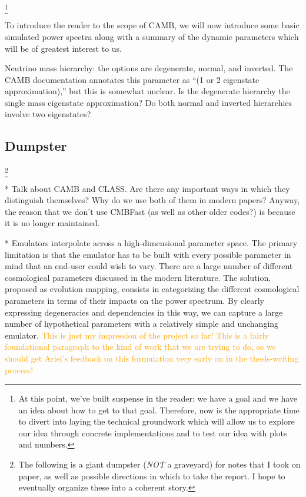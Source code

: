 \documentclass[11pt]{article}
\begin{document}
\footnote{
    At this point, we've built suspense in the reader: we have a goal and
    we have an idea about how to get to that goal. Therefore, now is the
    appropriate time to divert into laying the technical groundwork which
    will allow us to explore our idea through concrete implementations and
    to test our idea with plots and numbers.
}

To introduce the reader to the scope of CAMB, we will now introduce
some basic simulated power spectra along with a summary of the dynamic
parameters which will be of greatest interest to us.

Neutrino mass hierarchy: the options are degenerate, normal, and inverted.
The CAMB documentation annotates this parameter as ``(1 or 2 eigenstate
approximation),'' but this is somewhat unclear. Is the degenerate
hierarchy the single mass eigenstate approximation? Do both normal
and inverted hierarchies involve two eigenstates?

\begin{centering}
\section*{Dumpster}
\end{centering}

\footnote{
    The following is a giant dumpster (\textit{NOT} a graveyard) for notes
    that I took on paper, as well as possible directions in which to take the
    report. I hope to eventually organize these into a coherent story.
}

* Talk about CAMB and CLASS. Are there any important ways in which they
distinguish themselves? Why do we use both of them in modern papers? Anyway,
the reason that we don't use CMBFast (as well as other older codes?) is
because it is no longer maintained.

* Emulators interpolate across a high-dimensional parameter space. The primary
limitation is that the emulator has to be built with every possible parameter
in mind that an end-user could wish to vary. There are a large number of
different cosmological parameters discussed in the modern literature. The
solution, proposed as evolution mapping, consists in categorizing the
different cosmological parameters in terms of their impacts on the power
spectrum. By clearly expressing degeneracies and dependencies in this way, we
can capture a large number of hypothetical parameters with a relatively simple
and unchanging emulator. \textcolor{orange}{This is just my impression of the
project so far! This is a fairly foundational paragraph to the kind of work
that we are trying to do, so we should get Ariel's feedback on this
formulation very early on in the thesis-writing process!}
\end{document}
